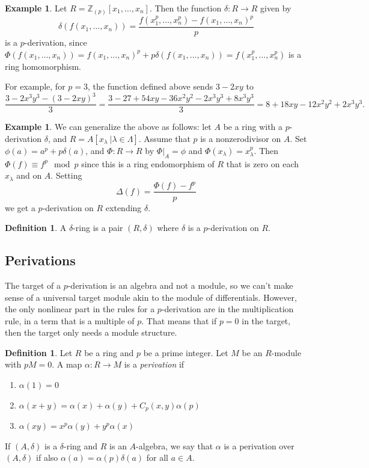 \documentclass{amsart}[12pt]
\newcommand{\Z}{\mathbb{Z}}
\numberwithin{equation}{section}
\theoremstyle{plain} %
\theoremstyle{definition}
\newtheorem{defn}[equation]{Definition}
\newtheorem{ex}[equation]{Example}
\theoremstyle{remark}
\begin{document}
\begin{ex} Let $R= \Z_{(p)}[x_1,\dots,x_n]$. Then the function $\delta:R\to R$ given by
 \[ \delta(f(x_1,\dots,x_n)) = \frac{f(x_1^p, \dots,x_n^p) - f(x_1,\dots, x_n)^p}{p}\]
 is a $p$-derivation, since $\Phi(f(x_1,\dots,x_n)) = f(x_1,\dots,x_n)^p + p\delta(f(x_1,\dots,x_n)) = f(x_1^p ,\dots,x_n^p)$ is a ring homomorphism.
 
 For example, for $p=3$, the function defined above sends $3-2xy$ to \[\frac{3-2x^3 y^3 - (3-2xy)^3}{3} = \frac{3 - 27 +54 xy - 36 x^2y^2 -2 x^3 y^3 + 8 x^3 y^3}{3} = 8  +  18 xy - 12 x^2 y^2  + 2x^3 y^3.\]
   \end{ex}
   
   \begin{ex} We can generalize the above as follows: 
let $A$ be a ring with a $p$-derivation $\delta$, and $R=A[x_{\lambda} \ | \lambda\in \Lambda]$. Assume that $p$ is a nonzerodivisor on $A$. Set $\phi(a) = a^p + p \delta(a)$, and $\Phi: R\to R$ by $\Phi|_A=\phi$ and $\Phi(x_\lambda) = x_\lambda^p$. Then $\Phi(f) \equiv f^p \mod p$ since this is a ring endomorphism of $R$ that is zero on each $x_\lambda$ and on $A$. Setting 
\[ \Delta(f) = \frac{\Phi(f) - f^p}{p}\]
we get a $p$-derivation on $R$ extending $\delta$.
\end{ex}
 
 \begin{defn} A $\delta$-ring is a pair $(R,\delta)$ where $\delta$ is a $p$-derivation on $R$.
 \end{defn}
 
 \subsection{Perivations}
 
 The target of a $p$-derivation is an algebra and not a module, so we can't make sense of a universal target module akin to the module of differentials. However, the only nonlinear part in the rules for a $p$-derivation are in the multiplication rule, in a term that is a multiple of $p$. That means that if $p=0$ in the target, then the target only needs a module structure. 
 
 \begin{defn} Let $R$ be a ring and $p$ be a prime integer. Let $M$ be an $R$-module with $pM=0$. A map $\alpha:R\to M$ is a \emph{perivation} if
 \begin{enumerate}
 \item $\alpha(1)=0$
 \item $\alpha(x+y) = \alpha(x) + \alpha(y) + C_p(x,y) \alpha(p)$
 \item $\alpha(xy) = x^p \alpha(y) + y^p\alpha(x)$
 \end{enumerate}
 
 If $(A,\delta)$ is a $\delta$-ring and $R$ is an $A$-algebra, we say that $\alpha$ is a perivation over $(A,\delta)$ if also $\alpha(a) = \alpha(p)\delta(a)$ for all $a\in A$.
 \end{defn}
 
\end{document}

